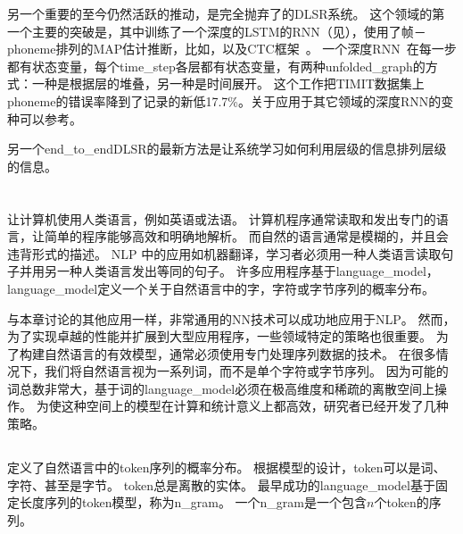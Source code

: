 另一个重要的至今仍然活跃的推动，是完全抛弃了的\gls{DL}\gls{SR}系统。
这个领域的第一个主要的突破是\citet{Graves-et-al-ICASSP2013}，其中训练了一个深度的\gls{LSTM}的\gls{RNN}（见），使用了帧－\gls{phoneme}排列的\gls{MAP}估计推断，比如\citet{chapter-gradient-document-2001}，以及CTC框架~\citep{Graves-et-al-2006,Graves-book2012}。
一个深度\gls{RNN}~\citep{Graves-et-al-ICASSP2013}在每一步都有状态变量，每个\gls{time_step}各层都有状态变量，有两种\gls{unfolded_graph}的方式：一种是根据层的堆叠，另一种是时间展开。
这个工作把TIMIT数据集上\gls{phoneme}的错误率降到了记录的新低17.7\%。关于应用于其它领域的深度\gls{RNN}的变种可以参考\citet{Pascanu-et-al-ICLR2014,Chung-et-al-NIPSDL2014-small}。

另一个\gls{end_to_end}\gls{DL}\gls{SR}的最新方法是让系统学习如何利用层级的信息排列层级的信息\citep{Chorowski-et-al-arxiv2014,llu_is2015b}。


\section{}
\label{sec: natural_language_processing}

 让计算机使用人类语言，例如英语或法语。
计算机程序通常读取和发出专门的语言，让简单的程序能够高效和明确地解析。
而自然的语言通常是模糊的，并且会违背形式的描述。
\gls{NLP} 中的应用如机器翻译，学习者必须用一种人类语言读取句子并用另一种人类语言发出等同的句子。
许多应用程序基于\gls{language_model}，\gls{language_model}定义一个关于自然语言中的字，字符或字节序列的概率分布。


与本章讨论的其他应用一样，非常通用的\gls{NN}技术可以成功地应用于\gls{NLP}。
然而，为了实现卓越的性能并扩展到大型应用程序，一些领域特定的策略也很重要。
为了构建自然语言的有效模型，通常必须使用专门处理序列数据的技术。
在很多情况下，我们将自然语言视为一系列词，而不是单个字符或字节序列。
因为可能的词总数非常大，基于词的\gls{language_model}必须在极高维度和稀疏的离散空间上操作。
为使这种空间上的模型在计算和统计意义上都高效，研究者已经开发了几种策略。

\subsection{}
\label{sec:n_grams}

定义了自然语言中的\gls{token}序列的概率分布。
根据模型的设计，\gls{token}可以是词、字符、甚至是字节。
\gls{token}总是离散的实体。
最早成功的\gls{language_model}基于固定长度序列的\gls{token}模型，称为\gls{n_gram}。
一个\gls{n_gram}是一个包含$n$个\gls{token}的序列。



